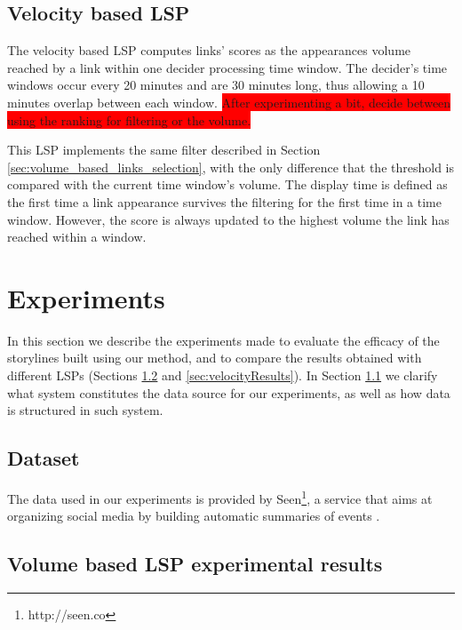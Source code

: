 \documentclass{sig-alternate}
\newcommand{\todo}[1]{\colorbox{red}{#1}}
\begin{document}
\subsection{Velocity based LSP}
\label{sec:velocity_based_links_selection}
The velocity based LSP computes links' scores as the appearances volume reached by a link within one decider processing time window. The decider's time windows occur every 20 minutes and are 30 minutes long, thus allowing a 10 minutes overlap between each window. \todo{After experimenting a bit, decide between using the ranking for filtering or the volume.}

This LSP implements the same filter described in Section \ref{sec:volume_based_links_selection}, with the only difference that the threshold is compared with the current time window's volume. The display time is defined as the first time a link appearance survives the filtering for the first time in a time window. However, the score is always updated to the highest volume the link has reached within a window.


\section{Experiments}
\label{sec:experiment}
In this section we describe the experiments made to evaluate the efficacy of the storylines built using our method, and to compare the results obtained with different LSPs (Sections \ref{sec:volumeResults} and \ref{sec:velocityResults}). In Section \ref{sec:dataset} we clarify what system constitutes the data source for our experiments, as well as how data is structured in such system.

\subsection{Dataset}
\label{sec:dataset}
The data used in our experiments is provided by Seen\footnote{http://seen.co}, a service that aims at organizing social media by building automatic summaries of events \cite{SeenWired}.

\subsection{Volume based LSP experimental results}
\label{sec:volumeResults}
\end{document}
